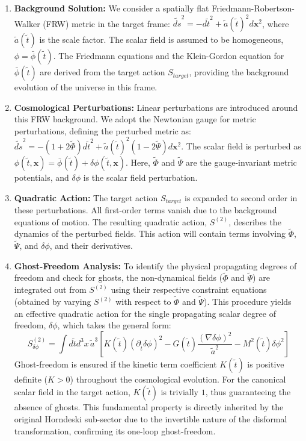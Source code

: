 \documentclass[twocolumn]{aastex631}
\begin{document}
\begin{enumerate}
    \item \textbf{Background Solution:} We consider a spatially flat Friedmann-Robertson-Walker (FRW) metric in the target frame: $\tilde{ds}^2 = -d\tilde{t}^2 + \tilde{a}(\tilde{t})^2 d\mathbf{x}^2$, where $\tilde{a}(\tilde{t})$ is the scale factor. The scalar field is assumed to be homogeneous, $\phi = \bar{\phi}(\tilde{t})$. The Friedmann equations and the Klein-Gordon equation for $\bar{\phi}(\tilde{t})$ are derived from the target action $S_{target}$, providing the background evolution of the universe in this frame.

    \item \textbf{Cosmological Perturbations:} Linear perturbations are introduced around this FRW background. We adopt the Newtonian gauge for metric perturbations, defining the perturbed metric as:
    $\tilde{ds}^2 = -(1+2\tilde{\Phi})d\tilde{t}^2 + \tilde{a}(\tilde{t})^2(1-2\tilde{\Psi})d\mathbf{x}^2$.
    The scalar field is perturbed as $\phi(\tilde{t}, \mathbf{x}) = \bar{\phi}(\tilde{t}) + \delta\phi(\tilde{t}, \mathbf{x})$. Here, $\tilde{\Phi}$ and $\tilde{\Psi}$ are the gauge-invariant metric potentials, and $\delta\phi$ is the scalar field perturbation.

    \item \textbf{Quadratic Action:} The target action $S_{target}$ is expanded to second order in these perturbations. All first-order terms vanish due to the background equations of motion. The resulting quadratic action, $S^{(2)}$, describes the dynamics of the perturbed fields. This action will contain terms involving $\tilde{\Phi}$, $\tilde{\Psi}$, and $\delta\phi$, and their derivatives.

    \item \textbf{Ghost-Freedom Analysis:} To identify the physical propagating degrees of freedom and check for ghosts, the non-dynamical fields ($\tilde{\Phi}$ and $\tilde{\Psi}$) are integrated out from $S^{(2)}$ using their respective constraint equations (obtained by varying $S^{(2)}$ with respect to $\tilde{\Phi}$ and $\tilde{\Psi}$). This procedure yields an effective quadratic action for the single propagating scalar degree of freedom, $\delta\phi$, which takes the general form:
    \begin{equation}
    S^{(2)}_{\delta\phi} = \int d\tilde{t} d^3x \, \tilde{a}^3 \left[ K(\tilde{t}) (\partial_{\tilde{t}}\delta\phi)^2 - G(\tilde{t}) \frac{(\nabla\delta\phi)^2}{\tilde{a}^2} - M^2(\tilde{t}) \delta\phi^2 \right]
    \end{equation}
    Ghost-freedom is ensured if the kinetic term coefficient $K(\tilde{t})$ is positive definite ($K>0$) throughout the cosmological evolution. For the canonical scalar field in the target action, $K(\tilde{t})$ is trivially $1$, thus guaranteeing the absence of ghosts. This fundamental property is directly inherited by the original Horndeski sub-sector due to the invertible nature of the disformal transformation, confirming its one-loop ghost-freedom.


\end{enumerate}
\end{document}

